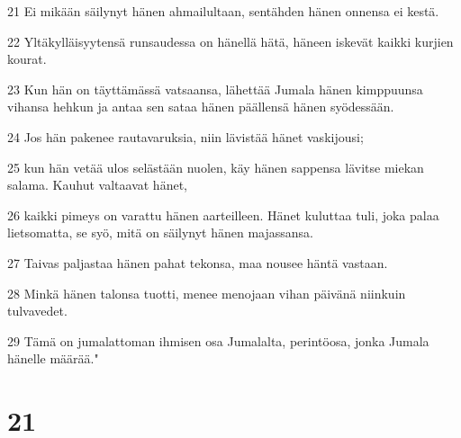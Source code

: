 \par 21 Ei mikään säilynyt hänen ahmailultaan, sentähden hänen onnensa ei kestä.
\par 22 Yltäkylläisyytensä runsaudessa on hänellä hätä, häneen iskevät kaikki kurjien kourat.
\par 23 Kun hän on täyttämässä vatsaansa, lähettää Jumala hänen kimppuunsa vihansa hehkun ja antaa sen sataa hänen päällensä hänen syödessään.
\par 24 Jos hän pakenee rautavaruksia, niin lävistää hänet vaskijousi;
\par 25 kun hän vetää ulos selästään nuolen, käy hänen sappensa lävitse miekan salama. Kauhut valtaavat hänet,
\par 26 kaikki pimeys on varattu hänen aarteilleen. Hänet kuluttaa tuli, joka palaa lietsomatta, se syö, mitä on säilynyt hänen majassansa.
\par 27 Taivas paljastaa hänen pahat tekonsa, maa nousee häntä vastaan.
\par 28 Minkä hänen talonsa tuotti, menee menojaan vihan päivänä niinkuin tulvavedet.
\par 29 Tämä on jumalattoman ihmisen osa Jumalalta, perintöosa, jonka Jumala hänelle määrää."

\chapter{21}

